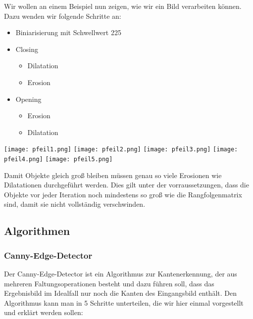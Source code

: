 Wir wollen an einem Beispiel nun zeigen, wie wir ein Bild verarbeiten können. Dazu wenden wir folgende Schritte an:
\begin{itemize}
    \item Biniarisierung mit Schwellwert 225
    \item Closing\\
          \begin{itemize}
              \item Dilatation
              \item Erosion
          \end{itemize}
    \item Opening\\
          \begin{itemize}
              \item Erosion
              \item Dilatation
          \end{itemize}
\end{itemize}

\vspace{5px}

\texttt{[image: pfeil1.png]}
\texttt{[image: pfeil2.png]}
\texttt{[image: pfeil3.png]}
\texttt{[image: pfeil4.png]}
\texttt{[image: pfeil5.png]}

Damit Objekte gleich groß bleiben müssen genau so viele Erosionen wie Dilatationen durchgeführt werden. Dies gilt unter der vorraussetzungen, dass die Objekte vor jeder Iteration noch mindestens so groß wie die Rangfolgenmatrix sind, damit sie nicht vollständig verschwinden.

\subsection{Algorithmen}

\subsubsection{Canny-Edge-Detector}
\label{sec:canny-edge-detector}

Der Canny-Edge-Detector ist ein Algorithmus zur Kantenerkennung, der aus mehreren Faltungsoperationen besteht und dazu führen soll, dass das Ergebnisbild im Idealfall nur noch die Kanten des Eingangsbild enthält. Den Algorithmus kann man in 5 Schritte unterteilen, die wir hier einmal vorgestellt und erklärt werden sollen:

